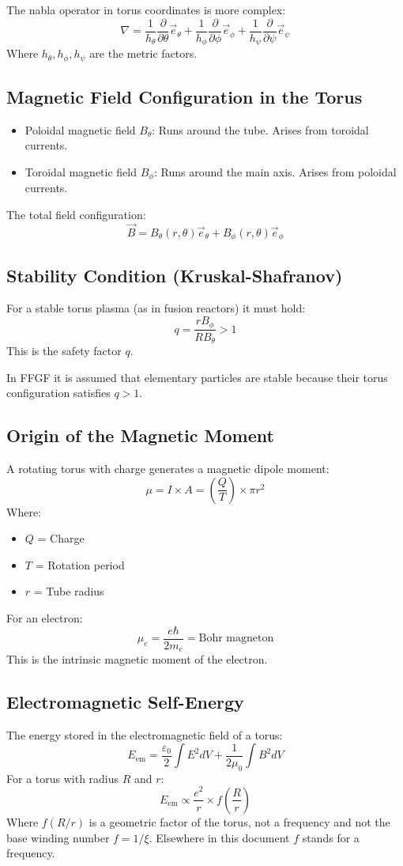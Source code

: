 The nabla operator in torus coordinates is more complex:
\[
\nabla = \frac{1}{h_\theta} \frac{\partial}{\partial \theta} \vec{e}_\theta + \frac{1}{h_\phi} \frac{\partial}{\partial \phi} \vec{e}_\phi + \frac{1}{h_\psi} \frac{\partial}{\partial \psi} \vec{e}_\psi
\]
Where \( h_\theta, h_\phi, h_\psi \) are the metric factors.

\subsection{Magnetic Field Configuration in the Torus}
\begin{itemize}
	\item Poloidal magnetic field \( B_\theta \):
	Runs around the tube. Arises from toroidal currents.
	\item Toroidal magnetic field \( B_\phi \):
	Runs around the main axis. Arises from poloidal currents.
\end{itemize}

The total field configuration:
\[
\vec{B} = B_\theta(r, \theta) \vec{e}_\theta + B_\phi(r, \theta) \vec{e}_\phi
\]

\subsection{Stability Condition (Kruskal-Shafranov)}
For a stable torus plasma (as in fusion reactors) it must hold:
\[
q = \frac{r B_\phi}{R B_\theta} > 1
\]
This is the safety factor \( q \).

In FFGF it is assumed that elementary particles are stable because their torus configuration satisfies \( q > 1 \).

\subsection{Origin of the Magnetic Moment}
A rotating torus with charge generates a magnetic dipole moment:
\[
\mu = I \times A = \left(\frac{Q}{T}\right) \times \pi r^2
\]
Where:
\begin{itemize}
	\item \( Q \) = Charge
	\item \( T \) = Rotation period
	\item \( r \) = Tube radius
\end{itemize}

For an electron:
\[
\mu_e = \frac{e \hbar}{2 m_e} = \text{Bohr magneton}
\]
This is the intrinsic magnetic moment of the electron.

\subsection{Electromagnetic Self-Energy}
The energy stored in the electromagnetic field of a torus:
\[
E_{\text{em}} = \frac{\varepsilon_0}{2} \int E^2 dV + \frac{1}{2\mu_0} \int B^2 dV
\]
For a torus with radius \( R \) and \( r \):
\[
E_{\text{em}} \propto \frac{e^2}{r} \times f\left(\frac{R}{r}\right)
\]
Where \( f(R/r) \) is a geometric factor of the torus, not a frequency and not the base winding number $f = 1/\xi$. Elsewhere in this document $f$ stands for a frequency.

